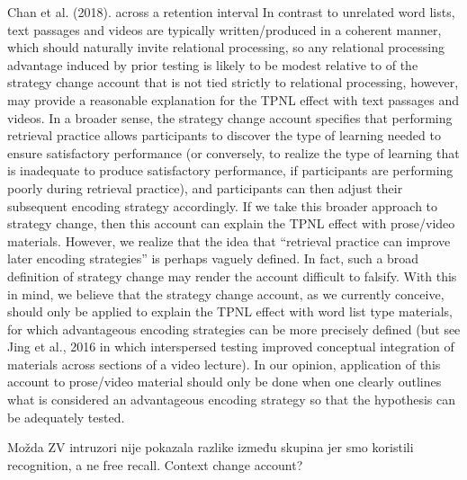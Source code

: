 \documentclass[../main.tex]{subfiles}
\begin{document}
Chan et al. (2018). across a retention interval
In contrast to unrelated word lists, text passages and videos are
typically written/produced in a coherent manner, which should naturally
invite relational processing, so any relational processing advantage
induced by prior testing is likely to be modest relative to
of the strategy change account that is not tied strictly to relational
processing, however, may provide a reasonable explanation for the
TPNL effect with text passages and videos. In a broader sense, the
strategy change account specifies that performing retrieval practice
allows participants to discover the type of learning needed to ensure
satisfactory performance (or conversely, to realize the type of learning
that is inadequate to produce satisfactory performance, if participants
are performing poorly during retrieval practice), and participants can
then adjust their subsequent encoding strategy accordingly. If we take
this broader approach to strategy change, then this account can explain
the TPNL effect with prose/video materials. However, we realize that
the idea that “retrieval practice can improve later encoding strategies”
is perhaps vaguely defined. In fact, such a broad definition of strategy
change may render the account difficult to falsify. With this in mind, we
believe that the strategy change account, as we currently conceive,
should only be applied to explain the TPNL effect with word list type
materials, for which advantageous encoding strategies can be more
precisely defined (but see Jing et al., 2016 in which interspersed testing
improved conceptual integration of materials across sections of a video
lecture). In our opinion, application of this account to prose/video
material should only be done when one clearly outlines what is considered
an advantageous encoding strategy so that the hypothesis can
be adequately tested.


Možda ZV intruzori nije pokazala razlike između skupina jer smo koristili 
recognition, a ne free recall.
Context change account?
\end{document}
